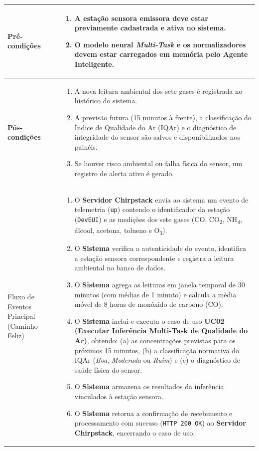 \documentclass[11pt, a4paper]{article}
\begin{document}
\begin{longtable}{|>{\bfseries}p{3.8cm}|p{12.4cm}|}
Pré-condições & 
\begin{enumerate}[nosep, leftmargin=0.5cm]
    \item A estação sensora emissora deve estar previamente cadastrada e ativa no sistema.
    \item O modelo neural \emph{Multi-Task} e os normalizadores devem estar carregados em memória pelo Agente Inteligente.
\end{enumerate} \\ \hline

Pós-condições & 
\begin{enumerate}[nosep, leftmargin=0.5cm]
    \item A nova leitura ambiental dos sete gases é registrada no histórico do sistema.
    \item A previsão futura (15 minutos à frente), a classificação do Índice de Qualidade do Ar (IQAr) e o diagnóstico de integridade do sensor são salvos e disponibilizados nos painéis.
    \item Se houver risco ambiental ou falha física do sensor, um registro de alerta ativo é gerado.
\end{enumerate} \\ \hline

Fluxo de Eventos Principal (Caminho Feliz) & 
\begin{enumerate}[nosep, leftmargin=0.5cm]
    \item O \textbf{Servidor Chirpstack} envia ao sistema um evento de telemetria (\texttt{up}) contendo o identificador da estação (\texttt{DevEUI}) e as medições dos sete gases (CO, CO\textsubscript{2}, NH\textsubscript{4}, álcool, acetona, tolueno e O\textsubscript{3}).
    \item O \textbf{Sistema} verifica a autenticidade do evento, identifica a estação sensora correspondente e registra a leitura ambiental no banco de dados.
    \item O \textbf{Sistema} agrega as leituras em janela temporal de 30 minutos (com médias de 1 minuto) e calcula a média móvel de 8 horas de monóxido de carbono (CO).
    \item O \textbf{Sistema} inclui e executa o caso de uso \textbf{UC02 (Executar Inferência Multi-Task de Qualidade do Ar)}, obtendo: (a) as concentrações previstas para os próximos 15 minutos, (b) a classificação normativa do IQAr (\emph{Boa}, \emph{Moderada} ou \emph{Ruim}) e (c) o diagnóstico de saúde física do sensor.
    \item O \textbf{Sistema} armazena os resultados da inferência vinculados à estação sensora.
    \item O \textbf{Sistema} retorna a confirmação de recebimento e processamento com sucesso (\texttt{HTTP 200 OK}) ao \textbf{Servidor Chirpstack}, encerrando o caso de uso.
\end{enumerate} \\ \hline


\end{longtable}
\end{document}
